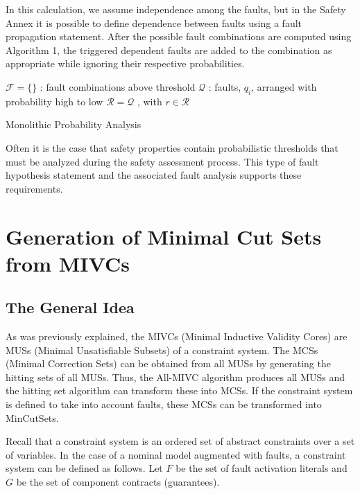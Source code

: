 In this calculation, we assume independence among the faults, but in the Safety Annex it is possible to define dependence between faults using a fault propagation statement. After the possible fault combinations are computed using Algorithm 1, the triggered dependent faults are added to the combination as appropriate while ignoring their respective probabilities.

\begin{algorithm}[H]
	$\mathcal{F} = \{\}$ : fault combinations above threshold \;
	$\mathcal{Q}$ : faults, $q_i$, arranged with probability high to low \;
	$\mathcal{R} = \mathcal{Q}$ , with $r \in \mathcal{R}$\;
	\caption{Monolithic Probability Analysis}
\end{algorithm}

Often it is the case that safety properties contain probabilistic thresholds that must be analyzed during the safety assessment process. This type of fault hypothesis statement and the associated fault analysis supports these requirements.

\section{Generation of Minimal Cut Sets from MIVCs}
\subsection{The General Idea}
As was previously explained, the MIVCs (Minimal Inductive Validity Cores) are MUSs (Minimal Unsatisfiable Subsets) of a constraint system. The MCSs (Minimal Correction Sets) can be obtained from all MUSs by generating the hitting sets of all MUSs. Thus, the All-MIVC algorithm produces all MUSs and the hitting set algorithm can transform these into MCSs. If the constraint system is defined to take into account faults, these MCSs can be transformed into MinCutSets. 

Recall that a constraint system is an ordered set of abstract constraints over a set of variables. In the case of a nominal model augmented with faults, a constraint system can be defined as follows. Let $F$ be the set of fault activation literals and $G$ be the set of component contracts (guarantees). 

